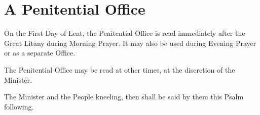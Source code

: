 \label{penitential}
\fancyhead[RE,LO]{}
\section{A Penitential Office}
\begin{secrubric}
	On the First Day of Lent, the Penitential Office is read immediately after the Great Litany during Morning Prayer. It may also be used during Evening Prayer or as a separate Office.
\end{secrubric}
\begin{secrubric}
    The Penitential Office may be read at other times, at the discretion of the Minister.
\end{secrubric}
\begin{secrubric}
    The Minister and the People kneeling, then shall be said by them this Psalm following.
\end{secrubric}
